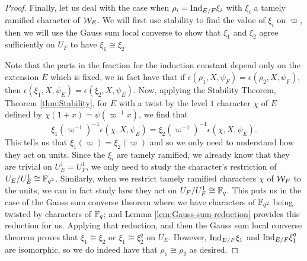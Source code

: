 \begin{proof}
  Finally, let us deal with the case when $\rho_i = \textrm{Ind}_{E/F} \xi_i$ with $\xi_i$ a tamely ramified character of $\mathcal{W}_E$.
  We will first use stability to find the value of $\xi_i$ on $\varpi$, then we will use the Gauss sum local converse to show that $\xi_1$ and $\xi_2$ agree sufficiently on $U_F$ to have $\xi_1 \cong \xi_2$.

  Note that the parts in the fraction for the induction constant depend only on the extension $E$ which is fixed, we in fact have that if $\epsilon(\rho_1,X,\psi_F) = \epsilon(\rho_2,X,\psi_F)$, then $\epsilon(\xi_1 ,X,\psi_E) = \epsilon(\xi_2, X,\psi_E)$.
  Now, applying the Stability Theorem, Theorem \ref{thm:Stability}, for $E$ with a twist by the level $1$ character $\chi$ of $E$ defined by $\chi(1+x) = \psi(\varpi^{-1} x)$, we find that
  \[\xi_1(\varpi^{-1})^{-1}\epsilon(\chi,X,\psi_E) = \xi_2(\varpi^{-1})^{-1} \epsilon(\chi,X,\psi_E).\]
  This tells us that $\xi_1(\varpi) = \xi_2(\varpi)$ and so we only need to understand how they act on units.
  Since the $\xi_i$ are tamely ramified, we already know that they are trivial on $U_E^1 = U_F^1$, we only need to study the character's restriction of $U_E/U_E^1 \cong \mathbb{F}_{q^2}$.
  Similarly, when we restrict tamely ramified characters $\chi$ of $\mathcal{W}_F$ to the units, we can in fact study how they act on $U_F/U_F^1 \cong \mathbb{F}_q$.
  This puts us in the case of the Gauss sum converse theorem where we have characters of $\mathbb{F}_{q^2}$ being twisted by characters of $\mathbb{F}_q$; and Lemma \ref{lem:Gauss-sum-reduction} provides this reduction for us.
  Applying that reduction, and then the Gauss sum local converse theorem proves that $\xi_1 \cong \xi_2$ or $\xi_1 \cong \xi_2^q$ on $U_E$.
  However, $\textrm{Ind}_{E/F} \xi_1$ and $\textrm{Ind}_{E/F} \xi_1^q$ are isomorphic, so we do indeed have that $\rho_1 \cong \rho_2$ as desired.

  
\end{proof}

